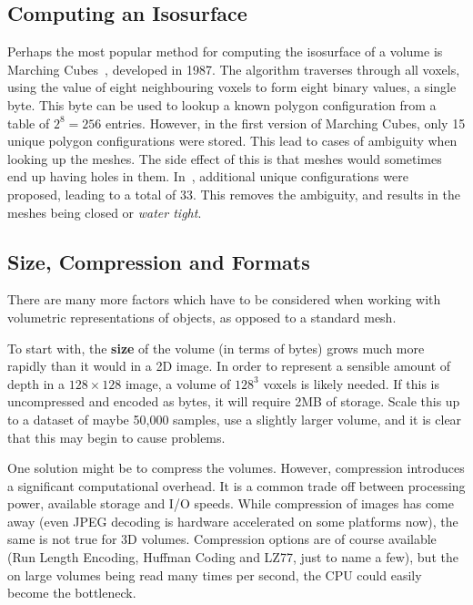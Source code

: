 \subsection{Computing an Isosurface}

Perhaps the most popular method for computing the isosurface of a
volume is Marching Cubes~\cite{lorensen1987marching}, developed in
1987. The algorithm traverses through all voxels, using the value of
eight neighbouring voxels to form eight binary values, a single
byte. This byte can be used to lookup a known polygon configuration
from a table of $2^8 = 256$ entries. However, in the first version of
Marching Cubes, only 15 unique polygon configurations were
stored. This lead to cases of ambiguity when looking up the
meshes. The side effect of this is that meshes would sometimes end up
having holes in them. In~\cite{chernyaev1995marching}, additional
unique configurations were proposed, leading to a total of 33. This
removes the ambiguity, and results in the meshes being closed or
\textit{water tight}.


\subsection{Size, Compression and Formats}
\label{sec:background:volstorage}

There are many more factors which have to be considered when working
with volumetric representations of objects, as opposed to a standard
mesh.

To start with, the \textbf{size} of the volume (in terms of bytes)
grows much more rapidly than it would in a 2D image. In order to
represent a sensible amount of depth in a $128 \times 128$ image, a
volume of $128^3$ voxels is likely needed. If this is uncompressed and
encoded as bytes, it will require 2MB of storage. Scale this up to a
dataset of maybe 50,000 samples, use a slightly larger volume, and it
is clear that this may begin to cause problems.

One solution might be to compress the volumes. However, compression
introduces a significant computational overhead. It is a common trade
off between processing power, available storage and I/O speeds. While
compression of images has come away (even JPEG decoding is hardware
accelerated on some platforms now), the same is not true for 3D
volumes. Compression options are of course available (Run Length
Encoding, Huffman Coding and LZ77, just to name a few), but the on
large volumes being read many times per second, the CPU could easily
become the bottleneck.

